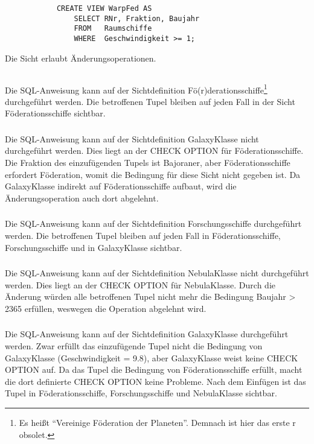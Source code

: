 \documentclass[ngerman]{gdb-aufgabenblatt}
\begin{document}
		\subsubsection{} %
			\begin{verbatim}
			CREATE VIEW WarpFed AS
			    SELECT RNr, Fraktion, Baujahr
			    FROM   Raumschiffe
			    WHERE  Geschwindigkeit >= 1;
			\end{verbatim}
			Die Sicht erlaubt Änderungsoperationen.
	\subsection{} %
		\subsubsection{} %
			Die SQL-Anweisung kann auf der Sichtdefinition Fö(r)derationsschiffe\footnote{Es heißt "`Vereinige Föderation der Planeten"'. Demnach ist hier das erste r obsolet.} durchgeführt werden. Die betroffenen Tupel bleiben auf jeden Fall in der Sicht Föderationsschiffe sichtbar.
		\subsubsection{} %
			Die SQL-Anweisung kann auf der Sichtdefinition GalaxyKlasse nicht durchgeführt werden. Dies liegt an der CHECK OPTION für Föderationsschiffe. Die Fraktion des einzufügenden Tupels ist Bajoraner, aber Föderationsschiffe erfordert Föderation, womit die Bedingung für diese Sicht nicht gegeben ist. Da GalaxyKlasse indirekt auf Föderationsschiffe aufbaut, wird die Änderungsoperation auch dort abgelehnt.
		\subsubsection{} %
			Die SQL-Anweisung kann auf der Sichtdefinition Forschungsschiffe durchgeführt werden. Die betroffenen Tupel bleiben auf jeden Fall in Föderationsschiffe, Forschungsschiffe und in GalaxyKlasse sichtbar.
		\subsubsection{} %
			Die SQL-Anweisung kann auf der Sichtdefinition NebulaKlasse nicht durchgeführt werden. Dies liegt an der CHECK OPTION für NebulaKlasse. Durch die Änderung würden alle betroffenen Tupel nicht mehr die Bedingung Baujahr > 2365 erfüllen, weswegen die Operation abgelehnt wird.
		\subsubsection{} %
			Die SQL-Anweisung kann auf der Sichtdefinition GalaxyKlasse durchgeführt werden. Zwar erfüllt das einzufügende Tupel nicht die Bedingung von GalaxyKlasse (Geschwindigkeit = 9.8), aber GalaxyKlasse weist keine CHECK OPTION auf. Da das Tupel die Bedingung von Föderationsschiffe erfüllt, macht die dort definierte CHECK OPTION keine Probleme. Nach dem Einfügen ist das Tupel in Föderationsschiffe, Forschungsschiffe und NebulaKlasse sichtbar.
\end{document}
